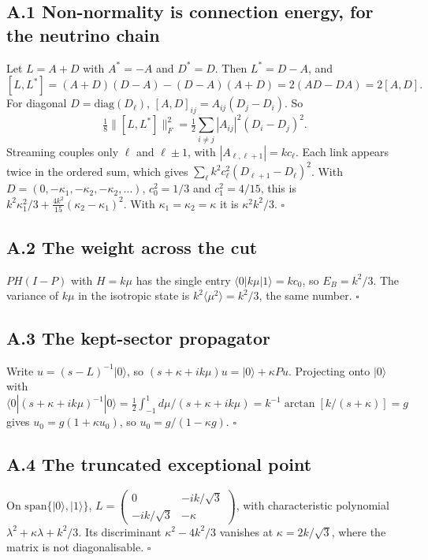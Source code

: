 \documentclass[11pt]{article}
\begin{document}
\subsection*{A.1 Non-normality is connection energy, for the neutrino chain}
Let $L=A+D$ with $A^\ast=-A$ and $D^\ast=D$. Then $L^\ast=D-A$, and
\[
[L,L^\ast]=(A+D)(D-A)-(D-A)(A+D)=2(AD-DA)=2[A,D].
\]
For diagonal $D=\mathrm{diag}(D_\ell)$, $[A,D]_{ij}=A_{ij}(D_j-D_i)$. So
\[
\tfrac18\lVert[L,L^\ast]\rVert_F^2=\tfrac12\sum_{i\neq j}|A_{ij}|^2(D_i-D_j)^2 .
\]
Streaming couples only $\ell$ and $\ell\pm1$, with $|A_{\ell,\ell+1}|=kc_\ell$. Each link appears twice in the ordered sum, which gives $\sum_\ell k^2c_\ell^2(D_{\ell+1}-D_\ell)^2$. With $D=(0,-\kappa_1,-\kappa_2,-\kappa_2,\dots)$, $c_0^2=1/3$ and $c_1^2=4/15$, this is $k^2\kappa_1^2/3+\tfrac{4k^2}{15}(\kappa_2-\kappa_1)^2$. With $\kappa_1=\kappa_2=\kappa$ it is $\kappa^2k^2/3$. $\square$
\subsection*{A.2 The weight across the cut}
$PH(I-P)$ with $H=k\mu$ has the single entry $\langle0|k\mu|1\rangle=kc_0$, so $E_B=k^2/3$. The variance of $k\mu$ in the isotropic state is $k^2\langle\mu^2\rangle=k^2/3$, the same number. $\square$
\subsection*{A.3 The kept-sector propagator}
Write $u=(s-L)^{-1}|0\rangle$, so $(s+\kappa+ik\mu)u=|0\rangle+\kappa Pu$. Projecting onto $|0\rangle$ with $\langle0|(s+\kappa+ik\mu)^{-1}|0\rangle=\tfrac12\int_{-1}^{1}d\mu/(s+\kappa+ik\mu)=k^{-1}\arctan[k/(s+\kappa)]=g$ gives $u_0=g(1+\kappa u_0)$, so $u_0=g/(1-\kappa g)$. $\square$
\subsection*{A.4 The truncated exceptional point}
On $\mathrm{span}\{|0\rangle,|1\rangle\}$, $L=\begin{pmatrix}0&-ik/\sqrt3\\-ik/\sqrt3&-\kappa\end{pmatrix}$, with characteristic polynomial $\lambda^2+\kappa\lambda+k^2/3$. Its discriminant $\kappa^2-4k^2/3$ vanishes at $\kappa=2k/\sqrt3$, where the matrix is not diagonalisable. $\square$
\end{document}
